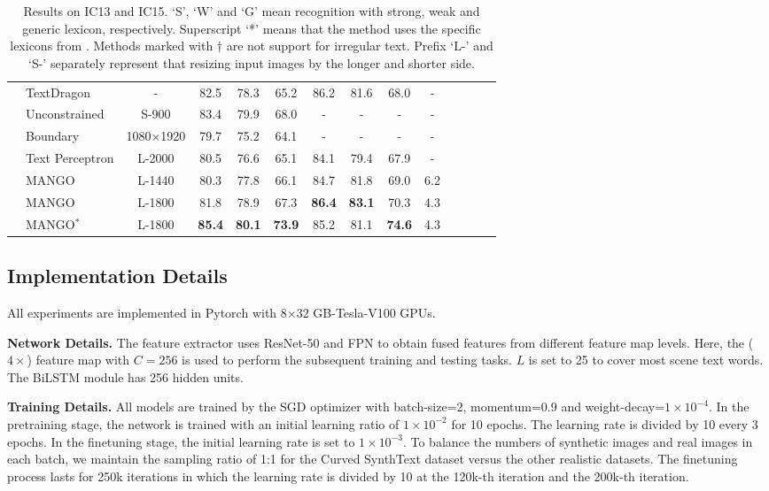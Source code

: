 \documentclass[letterpaper]{article} \usepackage{aaai21}  \usepackage{times}  \usepackage{helvet} \usepackage{courier}  \usepackage[hyphens]{url}  \usepackage{graphicx} \urlstyle{rm} \def\UrlFont{\rm}  \usepackage{natbib}  \usepackage{caption} \frenchspacing  \setlength{\pdfpagewidth}{8.5in}  \setlength{\pdfpageheight}{11in}  \usepackage{multirow}
\begin{document}
\begin{table*}[thb!]
\begin{center}
{\begin{tabular}{|c|l|c|c|c|c|c|c|c|c|c|c|c|c|}
&TextDragon \cite{feng2019textdragon} &- &  {82.5} & {78.3} & {65.2} & 86.2 & 81.6 & {68.0} &  - \\
&Unconstrained \cite{qin2019towards}  &  S-900  &  {83.4} & {79.9} & {68.0} & - & - & - &  - \\
&Boundary \cite{wang2020all} & 1080$\times$1920  &  {79.7} & {75.2} & {64.1} & - & - & - &  - \\
&Text Perceptron \cite{qiao2020text}  & L-2000  &  {80.5} & {76.6} & {65.1} & 84.1 & 79.4 & 67.9 &  - \\
\cline{2-10}
&MANGO  & L-1440  &   80.3 & 77.8 & 66.1 & 84.7 & 81.8 & 69.0 & 6.2\\
&MANGO  & L-1800 &   81.8 & 78.9 & 67.3 &\textbf{ 86.4} & \textbf{83.1} & 70.3 & 4.3\\
&MANGO$^*$  & L-1800  &  \textbf{85.4} & \textbf{80.1} & \textbf{73.9} & 85.2 & 81.1& \textbf{74.6} & 4.3 \\
\hline
\end{tabular}
}
\end{center}
\caption{Results on IC13 and IC15. `S', `W' and `G' mean recognition with strong, weak and generic lexicon, respectively. Superscript `*' means that the method uses the specific lexicons from \cite{liao2019mask}.  Methods marked with $\dagger$ are not support for irregular text. Prefix `L-' and `S-' separately represent that resizing input images by the longer and shorter side.
}
\label{tb:1}
\end{table*}


\subsection{Implementation Details}
All experiments are implemented in Pytorch with 8$\times$32 GB-Tesla-V100 GPUs.

\textbf{Network Details.}
The feature extractor uses ResNet-50 \cite{he2016deep} and FPN \cite{lin2017feature} to obtain fused features from different feature map levels.
Here, the ($4\times$) feature map with $C$$=$$256$ is used to perform the subsequent training and testing tasks.
$L$ is set to 25 to cover most scene text words. The BiLSTM module has 256 hidden units.

\textbf{Training Details.}
All models are trained by the SGD optimizer with batch-size=2, momentum=0.9 and weight-decay=$1\times 10^{-4}$.
In the pretraining stage, the network is trained with an initial learning ratio of $1\times 10^{-2}$ for 10 epochs.
The learning rate is divided by 10 every 3 epochs.
In the finetuning stage, the initial learning rate is set to $1\times 10^{-3}$.
To balance the numbers of synthetic images and real images in each batch, we maintain the sampling ratio of 1:1 for the Curved SynthText dataset versus the other realistic datasets.
The finetuning process lasts for 250k iterations in which the learning rate is divided by 10 at the 120k-th iteration and the 200k-th iteration.
\end{document}
